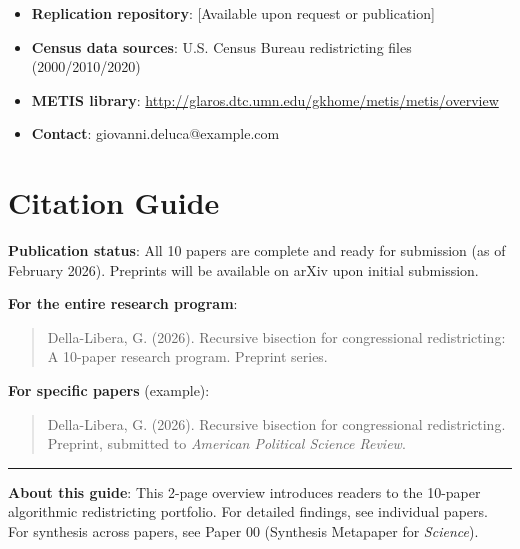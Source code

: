 \documentclass[11pt]{article}
\begin{document}
\begin{itemize}[leftmargin=*,noitemsep,topsep=4pt]
    \item \textbf{Replication repository}: [Available upon request or publication]
    \item \textbf{Census data sources}: U.S. Census Bureau redistricting files (2000/2010/2020)
    \item \textbf{METIS library}: \url{http://glaros.dtc.umn.edu/gkhome/metis/metis/overview}
    \item \textbf{Contact}: giovanni.deluca@example.com
\end{itemize}

\section*{Citation Guide}

\textbf{Publication status}: All 10 papers are complete and ready for submission (as of February 2026). Preprints will be available on arXiv upon initial submission.

\textbf{For the entire research program}:

\begin{quote}
Della-Libera, G. (2026). Recursive bisection for congressional redistricting: A 10-paper research program. Preprint series.
\end{quote}

\textbf{For specific papers} (example):

\begin{quote}
Della-Libera, G. (2026). Recursive bisection for congressional redistricting. Preprint, submitted to \emph{American Political Science Review}.
\end{quote}

\vspace{12pt}

\noindent\rule{\textwidth}{0.4pt}

\vspace{6pt}

\noindent\textbf{About this guide}: This 2-page overview introduces readers to the 10-paper algorithmic redistricting portfolio. For detailed findings, see individual papers. For synthesis across papers, see Paper 00 (Synthesis Metapaper for \emph{Science}).
\end{document}
